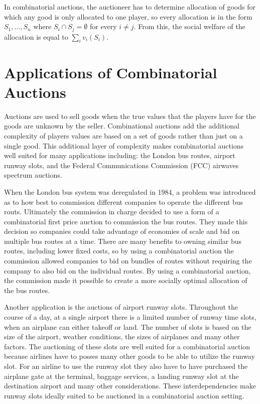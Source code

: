 \documentclass[10pt,onecolumn,letterpaper]{article}
\theoremstyle{definition}
\begin{document}
In combinatorial auctions, the auctioneer has to determine allocation of goods for which any good is only allocated to one player, so every allocation is in the form $S_1,...,S_n$ where $S_i \cap S_j = \emptyset$ for every $i \neq j$. From this, the social welfare of the allocation is equal to $\sum_i v_i(S_i)$.

\section{Applications of Combinatorial Auctions}

Auctions are used to sell goods when the true values that the players have for the goods are unknown by the seller. Combinational auctions add the additional complexity of players values are based on a set of goods rather than just on a single good. This additional layer of complexity makes combinatorial auctions well suited for many applications including: the London bus routes, airport runway slots, and the Federal Communications Commission (FCC) airwaves spectrum auctions. 

When the London bus system was deregulated in 1984, a problem was introduced as to how best to commission different companies to operate the different bus routs. Ultimately the commission in charge decided to use a form of a combinatorial first price auction to commission the bus routes. They made this decision so companies could take advantage of economies of scale and bid on multiple bus routes at a time. There are many benefits to owning similar bus routes, including lower fixed costs, so by using a combinatorial auction the commission allowed companies to bid on bundles of routes without requiring the company to also bid on the individual routes. By using a combinatorial auction, the commission made it possible to create a more socially optimal allocation of the bus routes. 

Another application is the auctions of airport runway slots. Throughout the course of a day, at a single airport there is a limited number of runway time slots, when an airplane can either takeoff or land. The number of slots is based on the size of the airport, weather conditions, the sizes of airplanes and many other factors. The auctioning of these slots are well suited for a combinatorial auction because airlines have to posses many other goods to be able to utilize the runway slot. For an airline to use the runway slot they also have to have purchased the airplane gate at the terminal, baggage services, a landing runway slot at the destination airport and many other considerations. These interdependencies make runway slots ideally suited to be auctioned in a combinatorial auction setting. 
\end{document}
